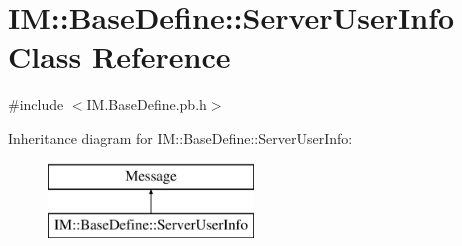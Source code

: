 \hypertarget{class_i_m_1_1_base_define_1_1_server_user_info}{}\section{I\+M\+:\+:Base\+Define\+:\+:Server\+User\+Info Class Reference}
\label{class_i_m_1_1_base_define_1_1_server_user_info}


{\ttfamily \#include $<$I\+M.\+Base\+Define.\+pb.\+h$>$}

Inheritance diagram for I\+M\+:\+:Base\+Define\+:\+:Server\+User\+Info\+:\begin{figure}[H]
\begin{center}
\leavevmode
\includegraphics[height=2.000000cm]{class_i_m_1_1_base_define_1_1_server_user_info}
\end{center}
\end{figure}
